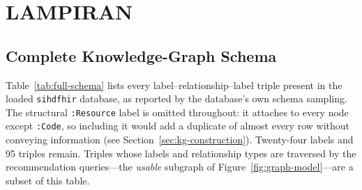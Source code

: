 \chapter*{LAMPIRAN}

\section{Complete Knowledge-Graph Schema}
\label{app:schema}

Table~\ref{tab:full-schema} lists every label--relationship--label triple present in the
loaded \texttt{sihdfhir} database, as reported by the database's own schema sampling. The
structural \texttt{:Resource} label is omitted throughout: it attaches to every node except
\texttt{:Code}, so including it would add a duplicate of almost every row without conveying
information (see Section~\ref{sec:kg-construction}). Twenty-four labels and 95 triples
remain. Triples whose labels and relationship types are traversed by the recommendation
queries---the \emph{usable} subgraph of Figure~\ref{fig:graph-model}---are a subset of this
table.

